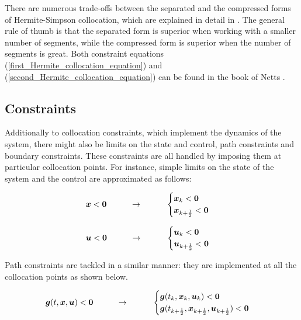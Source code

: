 \documentclass{thesisreport}
\begin{document}
  There are numerous trade-offs between the separated and the compressed forms of Hermite-Simpson collocation, which are explained in detail in \cite{Betts2010}. The general rule of thumb is that the separated form is superior when working with a smaller number of segments, while the compressed form is superior when the number of segments is great. Both constraint equations (\ref{first_Hermite_collocation_equation})
and (\ref{second_Hermite_collocation_equation})  can be found in the book of Netts \cite{Betts2010}. 



\subsection{Constraints}


Additionally to collocation constraints, which implement the dynamics of the system, there might also be limits on the state and control, path constraints and boundary constraints. These constraints are all handled by imposing them at particular collocation points. For instance, simple limits on the state of the system and the control are approximated as follows:

\begin{equation}
\bm{x}<\bm{0} \text{\hspace{1cm}}\rightarrow  \text{\hspace{1cm}} \begin{cases}
\bm{x}_k <\bm{0} \\
\bm{x}_{k+\frac{1}{2}}<\bm{0}
\end{cases}
\end{equation}

\begin{equation}
\bm{u}<\bm{0} \text{\hspace{1cm}}\rightarrow  \text{\hspace{1cm}} \begin{cases}
\bm{u}_k <\bm{0} \\
\bm{u}_{k+\frac{1}{2}}<\bm{0}
\end{cases}
\end{equation}

\noindent Path constraints are tackled in a similar manner: they are implemented at all the collocation points as shown below.


\begin{equation}
\bm{g}(t,\bm{x},\bm{u}) < \bm{0} \text{\hspace{1cm}} \rightarrow \text{\hspace{1cm}} \begin{cases}
\bm{g}(t_k, \bm{x}_k,\bm{u}_k) < \bm{0} \\
\bm{g}(t_{k+\frac{1}{2}}, \bm{x}_{k+\frac{1}{2}},\bm{u}_{k+ \frac{1}{2}}) < \bm{0} \\
\end{cases}
\end{equation}
\end{document}
